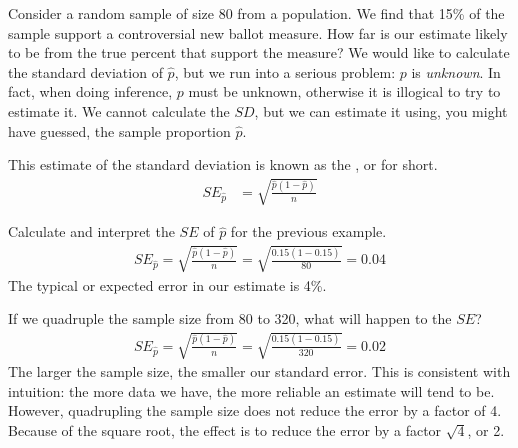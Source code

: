 \begin{examplewrap}
\begin{nexample}{Consider a random sample of size 80 from a population.  We find that 15\% of the sample support a controversial new ballot measure.  How far is our estimate likely to be from the true percent that support the measure?}  We would like to calculate the standard deviation of $\hat{p}$, but we run into a serious problem: $p$ is \emph{unknown}. In fact, when doing inference, $p$ must be unknown, otherwise it is illogical to try to estimate it. We cannot calculate the $SD$, but we can estimate it using, you might have guessed, the sample proportion $\hat{p}$.
\end{nexample}
\end{examplewrap}
 
This estimate of the standard deviation is known as the , or  for short.
\begin{align*}
SE_{\hat{p}}&=\sqrt{\frac{\hat{p}(1-\hat{p})}{n}}
\end{align*}

\begin{examplewrap}
\begin{nexample}{Calculate and interpret the $SE$ of $\hat{p}$ for the previous example.}
\begin{align*}
SE_{\hat{p}}=\sqrt{\frac{\hat{p}(1-\hat{p})}{n}} =\sqrt{\frac{0.15(1-0.15)}{80}}=0.04
\end{align*}
The typical or expected error in our estimate is 4\%.
\end{nexample}
\end{examplewrap}

\begin{examplewrap}
\begin{nexample}{If we quadruple the sample size from 80 to 320, what will happen to the $SE$?}
\begin{align*}
SE_{\hat{p}}=\sqrt{\frac{\hat{p}(1-\hat{p})}{n}} =\sqrt{\frac{0.15(1-0.15)}{320}}=0.02
\end{align*}
The larger the sample size, the smaller our standard error. This is consistent with intuition: the more data we have, the more reliable an estimate will tend to be. However, quadrupling the sample size does not reduce the error by a factor of 4. Because of the square root, the effect is to reduce the error by a factor $\sqrt{4}$, or 2. 
\end{nexample}
\end{examplewrap}

